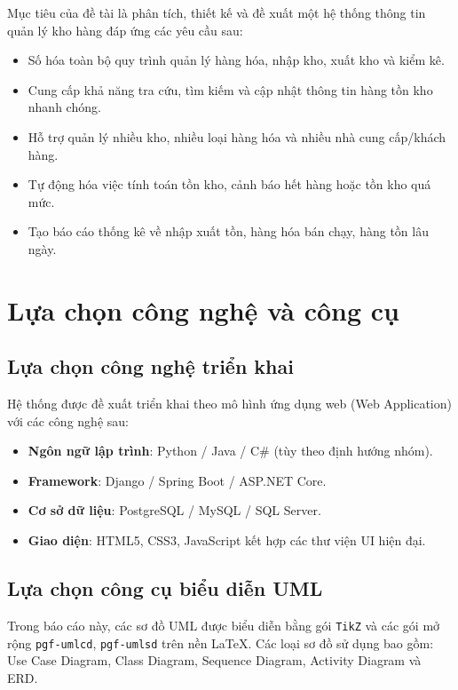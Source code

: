 Mục tiêu của đề tài là phân tích, thiết kế và đề xuất một hệ thống thông tin quản lý kho hàng đáp ứng các yêu cầu sau:

\begin{itemize}[leftmargin=1.5cm]
    \item Số hóa toàn bộ quy trình quản lý hàng hóa, nhập kho, xuất kho và kiểm kê.
    \item Cung cấp khả năng tra cứu, tìm kiếm và cập nhật thông tin hàng tồn kho nhanh chóng.
    \item Hỗ trợ quản lý nhiều kho, nhiều loại hàng hóa và nhiều nhà cung cấp/khách hàng.
    \item Tự động hóa việc tính toán tồn kho, cảnh báo hết hàng hoặc tồn kho quá mức.
    \item Tạo báo cáo thống kê về nhập xuất tồn, hàng hóa bán chạy, hàng tồn lâu ngày.
\end{itemize}

\section{Lựa chọn công nghệ và công cụ}

\subsection{Lựa chọn công nghệ triển khai}

Hệ thống được đề xuất triển khai theo mô hình ứng dụng web (Web Application) với các công nghệ sau:

\begin{itemize}[leftmargin=1.5cm]
    \item \textbf{Ngôn ngữ lập trình}: Python / Java / C\# (tùy theo định hướng nhóm).
    \item \textbf{Framework}: Django / Spring Boot / ASP.NET Core.
    \item \textbf{Cơ sở dữ liệu}: PostgreSQL / MySQL / SQL Server.
    \item \textbf{Giao diện}: HTML5, CSS3, JavaScript kết hợp các thư viện UI hiện đại.
\end{itemize}

\subsection{Lựa chọn công cụ biểu diễn UML}

Trong báo cáo này, các sơ đồ UML được biểu diễn bằng gói \texttt{TikZ} và các gói mở rộng \texttt{pgf-umlcd}, \texttt{pgf-umlsd} trên nền LaTeX. Các loại sơ đồ sử dụng bao gồm: Use Case Diagram, Class Diagram, Sequence Diagram, Activity Diagram và ERD.
